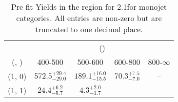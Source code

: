 \begin{table}[h!]
\tiny
\centering
\caption{Pre fit Yields in the \gj region for 2.1\ifb for monojet categories. All entries are non-zero but are truncated to one decimal place.\label{tab:prednodatanaive_gj_comb_mono}}
\begin{tabular}
{ccccc}
	\hline\hline
	& \multicolumn{4}{c}{\scalht (\gev)} \\ 
	 (\njet,  \nb) & 400-500 & 500-600 & 600-800 & 800-$\infty$ \\ [0.8ex] 
\hline
	(1, 0) & $572.5^{+ 29.4 }_{- 29.0 }$ & $189.1^{+ 16.0 }_{- 15.5 }$ & $70.3^{+ 7.5 }_{- 7.0 }$ & -- \\[0.5ex] 
	(1, 1) & $24.4^{+ 6.2 }_{- 5.7 }$ & $4.3^{+ 2.0 }_{- 1.7 }$ & -- & -- \\[0.5ex] 
	\hline
	\hline
\end{tabular}
\end{table}
